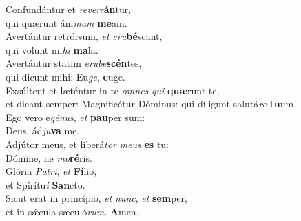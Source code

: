 \evenverse Confundántur et \textit{re}\textit{ve}\textit{re}\textbf{án}tur,~\*\\
\evenverse qui quærunt áni\textit{mam} \textbf{me}am.\\
\oddverse Avertántur retrórsum, \textit{et} \textit{e}\textit{ru}\textbf{bé}scant,~\*\\
\oddverse qui volunt mi\textit{hi} \textbf{ma}la.\\
\evenverse Avertántur statim \textit{e}\textit{ru}\textit{be}\textbf{scén}tes,~\*\\
\evenverse qui dicunt mihi: Eu\textit{ge}, \textbf{e}uge.\\
\oddverse Exsúltent et læténtur in te \textit{om}\textit{nes} \textit{qui} \textbf{quæ}runt te,~\*\\
\oddverse et dicant semper: Magnificétur Dóminus: qui díligunt salutá\textit{re} \textbf{tu}um.\\
\evenverse Ego vero e\textit{gé}\textit{nus}, \textit{et} \textbf{pau}per sum:~\*\\
\evenverse Deus, ád\textit{ju}\textbf{va} me.\\
\oddverse Adjútor meus, et liberá\textit{tor} \textit{me}\textit{us} \textbf{es} tu:~\*\\
\oddverse Dómine, ne \textit{mo}\textbf{ré}ris.\\
\evenverse Glória \textit{Pa}\textit{tri}, \textit{et} \textbf{Fí}lio,~\*\\
\evenverse et Spirítu\textit{i} \textbf{San}cto.\\
\oddverse Sicut erat in princípio, \textit{et} \textit{nunc}, \textit{et} \textbf{sem}per,~\*\\
\oddverse et in sǽcula sæculó\textit{rum}. \textbf{A}men.\\
